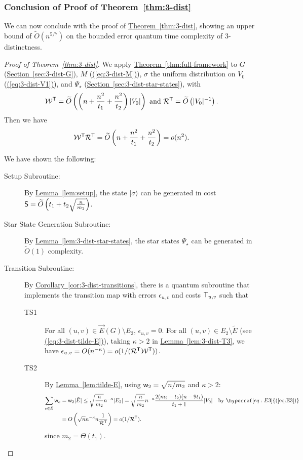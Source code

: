 \documentclass{article}
\newcommand{\eq}[1]{\hyperref[eq:#1]{(\ref*{eq:#1})}}
\renewcommand{\sec}[1]{\hyperref[sec:#1]{Section~\ref*{sec:#1}}}
\newcommand{\thm}[1]{\hyperref[thm:#1]{Theorem~\ref*{thm:#1}}}
\newcommand{\lem}[1]{\hyperref[lem:#1]{Lemma~\ref*{lem:#1}}}
\newcommand{\cor}[1]{\hyperref[cor:#1]{Corollary~\ref*{cor:#1}}}
\def\ket#1{{\lvert}#1\rangle}
\renewcommand{\>}{\rangle}
\newcommand{\<}{\langle}
\renewcommand{\(}{\left(}
\renewcommand{\)}{\right)}
\def\w{{\sf w}}
\begin{document}
\subsubsection{Conclusion of Proof of Theorem~\ref{thm:3-dist}}

We can now conclude with the proof of \thm{3-dist}, showing an upper bound of $\widetilde{O}(n^{5/7})$ on the bounded error quantum time complexity of $3$-distinctness. 

\begin{proof}[Proof of Theorem~\ref{thm:3-dist}]
We apply \thm{full-framework} to $G$ (\sec{3-dist-G}), $M$ (\eq{3-dist-M}),  $\sigma$ the uniform distribution on $V_0$ (\eq{3-dist-V1}), and $\Psi_\star$ (\sec{3-dist-star-states}), with 
$${\cal W}^{\sf T}=\widetilde{O}\left(\left(n + \frac{n^2}{t_1} +\frac{n^2}{t_2}\right)|V_0|\right)
\mbox{ and }
{\cal R}^{\sf T}=\widetilde{O}\left(|V_0|^{-1} \right).$$
Then we have
$${\cal W}^{\sf T}{\cal R}^{\sf T} = \widetilde{O}\left(n + \frac{n^2}{t_1} +\frac{n^2}{t_2}\right)= o(n^2).$$

\noindent We have shown the following:
\begin{description}
\item[Setup Subroutine:] By \lem{setup}, the state $\ket{\sigma}$ can be generated in cost ${\sf S}=\widetilde{O}\left(t_1+t_2\sqrt{\frac{n}{m_2}}\right)$.
\item[Star State Generation Subroutine:] By \lem{3-dist-star-states}, the star states ${\Psi_\star}$ can be generated in $\widetilde{O}(1)$ complexity.
\item[Transition Subroutine:] By \cor{3-dist-transitions}, there is a quantum subroutine that implements the transition map with errors $\epsilon_{u,v}$ and costs ${\sf T}_{u,v}$ such that
\begin{description}
\item[TS1] For all $(u,v)\in \overrightarrow{E}(G)\setminus E_2$, $\epsilon_{u,v}=0$. For all $(u,v)\in E_2\setminus\tilde{E}$ (see \eq{3-dist-tilde-E}), taking $\kappa>2$ in \lem{3-dist-T3}, we have $\epsilon_{u,v}
=O(n^{-\kappa})=o(1/({\cal R}^{\sf T}{\cal W}^{\sf T}))$.
\item[TS2] By \lem{tilde-E}, using $\w_2=\sqrt{n/m_2}$ and $\kappa>2$:
\begin{align*}
\sum_{e\in \tilde{E}}\w_e &= \w_2|\tilde{E}| \leq \sqrt{\frac{n}{m_2}}n^{-\kappa}|E_2| = \sqrt{\frac{n}{m_2}}n^{-\kappa}\frac{2(m_2-t_2)(n-9t_1)}{t_1+1}|V_0| &\mbox{by }\eq{E3}\\
&= {O}\left(\sqrt{n}n^{-\kappa}n\frac{1}{{\cal R}^{\sf T}}\right) = o(1/{\cal R}^{\sf T}). 
\end{align*}
since $m_2=\Theta(t_1)$.


\end{description}
\end{description}
\end{proof}
\end{document}

